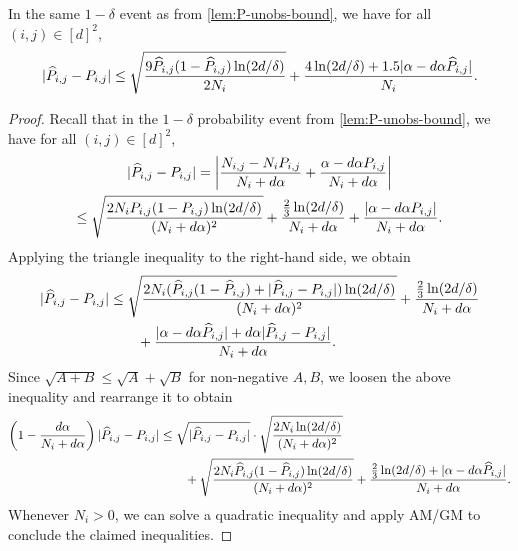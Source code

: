 \begin{lemma}
  \label{lem:P-obs-bound}
  In the same $1-\delta$ event as from \cref{lem:P-unobs-bound},
  we have for all $(i,j) \in [d]^2$,
  \begin{equation*}
    |\widehat{P}_{i,j} - P_{i,j}|
    \leq
    \sqrt{\frac{9\widehat{P}_{i,j}(1-\widehat{P}_{i,j})\ln(2d/\delta)}{2N_i}}
    + \frac{4\ln(2d/\delta)+1.5|\alpha-d\alpha\widehat{P}_{i,j}|}{N_i}
    .
  \end{equation*}
\end{lemma}
\begin{proof}
  Recall that in the $1-\delta$ probability event from
  \cref{lem:P-unobs-bound}, we have for all $(i,j) \in [d]^2$,
  \begin{multline*}
    | \widehat{P}_{i,j} - P_{i,j} |
    =
    \left|
      \frac{N_{i,j} - N_i P_{i,j}}{N_i + d\alpha}
      + \frac{\alpha - d\alpha P_{i,j}}{N_i + d\alpha}
    \right| \\
    \leq
    \sqrt{\frac{2N_iP_{i,j}(1-P_{i,j})\ln(2d/\delta)}{(N_i+d\alpha)^2}}
    + \frac{\frac23\ln(2d/\delta)}{N_i+d\alpha}
    + \frac{|\alpha-d\alpha P_{i,j}|}{N_i+d\alpha}
    .
  \end{multline*}
  Applying the triangle inequality to the right-hand side, we obtain
  \begin{align}
    | \widehat{P}_{i,j} - P_{i,j} |
    & \leq
    \sqrt{
      \frac{
        2N_i(
          \widehat{P}_{i,j}(1-\widehat{P}_{i,j})
          + |\widehat{P}_{i,j} - P_{i,j}|
        ) \ln(2d/\delta)
      }{(N_i+d\alpha)^2}
    }
    + \frac{\frac23\ln(2d/\delta)}{N_i+d\alpha}
    \notag \\
    & \qquad
    + \frac{
      |\alpha-d\alpha \widehat{P}_{i,j}|
      + d\alpha|\widehat{P}_{i,j}-P_{i,j}|
    }{N_i+d\alpha}
    .
    \notag
  \end{align}
  Since $\sqrt{A+B} \leq \sqrt{A} + \sqrt{B}$ for non-negative $A,B$, we
  loosen the above inequality and rearrange it to obtain
  \begin{align*}
    \left( 1 - \frac{d\alpha}{N_i+d\alpha} \right)
    |\widehat{P}_{i,j} - P_{i,j}|
    & \leq
    \sqrt{|\widehat{P}_{i,j} - P_{i,j}|} \cdot
    \sqrt{\frac{2N_i\ln(2d/\delta)}{(N_i+d\alpha)^2}}
    \\
    & \qquad
    +
    \sqrt{\frac{2N_i\widehat{P}_{i,j}(1-\widehat{P}_{i,j})\ln(2d/\delta)}{(N_i+d\alpha)^2}}
    + \frac{\frac23\ln(2d/\delta) + |\alpha -
    d\alpha\widehat{P}_{i,j}|}{N_i+d\alpha}
    .
  \end{align*}
  Whenever $N_i > 0$, we can solve a quadratic inequality and apply
  AM/GM to conclude the claimed inequalities.
\end{proof}

